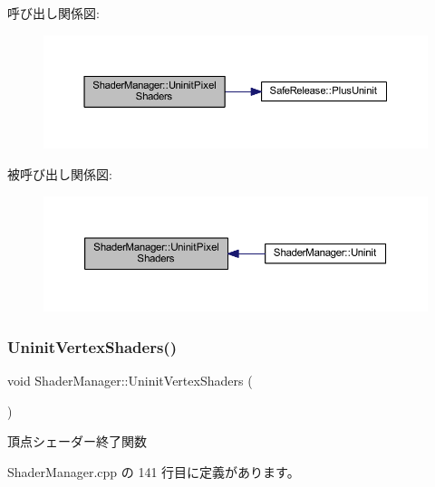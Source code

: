 呼び出し関係図\+:
\nopagebreak
\begin{figure}[H]
\begin{center}
\leavevmode
\includegraphics[width=350pt]{class_shader_manager_a1edd1b68c7949022217f98bce8360d3c_cgraph}
\end{center}
\end{figure}
被呼び出し関係図\+:
\nopagebreak
\begin{figure}[H]
\begin{center}
\leavevmode
\includegraphics[width=350pt]{class_shader_manager_a1edd1b68c7949022217f98bce8360d3c_icgraph}
\end{center}
\end{figure}
\mbox{\label{class_shader_manager_af3b8f2931857016315e018041321f35a}} 
\subsubsection{\texorpdfstring{Uninit\+Vertex\+Shaders()}{UninitVertexShaders()}}
{\footnotesize\ttfamily void Shader\+Manager\+::\+Uninit\+Vertex\+Shaders (\begin{DoxyParamCaption}{ }\end{DoxyParamCaption})\hspace{0.3cm}{\ttfamily [private]}}



頂点シェーダー終了関数 



 Shader\+Manager.\+cpp の 141 行目に定義があります。

